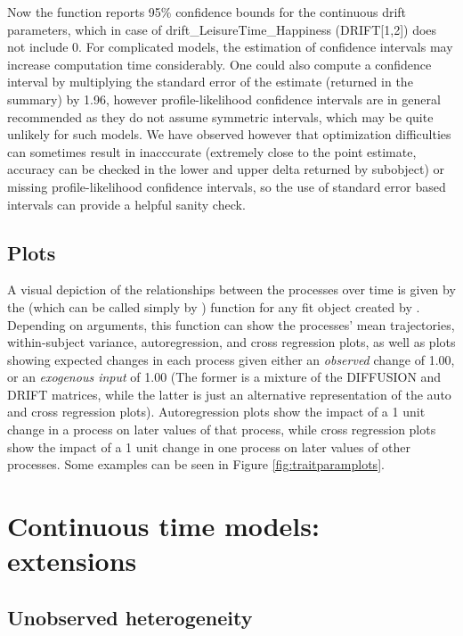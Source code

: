\documentclass[nojss]{jss}\usepackage[]{graphicx}\usepackage[]{color}
\begin{document}
Now the  function reports 95\% confidence bounds for the continuous drift parameters, which in case of drift\_LeisureTime\_Happiness (DRIFT[1,2]) does not include 0. For complicated models, the estimation of confidence intervals may increase computation time considerably.  One could also compute a confidence interval by multiplying the standard error of the estimate (returned in the summary) by 1.96, however profile-likelihood confidence intervals are in general recommended as they do not assume symmetric intervals, which may be quite unlikely for such models. We have observed however that optimization difficulties can sometimes result in inacccurate (extremely close to the point estimate, accuracy can be checked in the lower and upper delta returned by  subobject) or missing profile-likelihood confidence intervals, so the use of standard error based intervals can provide a helpful sanity check. 

\subsection{Plots}\nopagebreak
A visual depiction of the relationships between the processes over time is given by the  (which can be called simply by ) function for any fit object created by . Depending on arguments, this function can show the processes' mean trajectories, within-subject variance, autoregression, and cross regression plots, as well as plots showing expected changes in each process given either an \textit{observed} change of 1.00, or an \textit{exogenous input} of 1.00 (The former is a mixture of the DIFFUSION and DRIFT matrices, while the latter is just an alternative representation of the auto and cross regression plots). Autoregression plots show the impact of a 1 unit change in a process on later values of that process, while cross regression plots show the impact of a 1 unit change in one process on later values of other processes. Some examples can be seen in Figure \ref{fig:traitparamplots}.

\section{Continuous time models: extensions} \label{sec:extensions}\nopagebreak
\subsection{Unobserved heterogeneity}\nopagebreak
\end{document}
